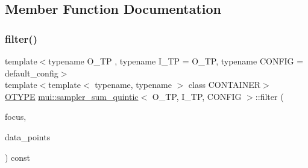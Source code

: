 \subsection{Member Function Documentation}
\mbox{\label{classmui_1_1sampler__sum__quintic_aadcd797ddd143dd5eacf60f9cfad5852}} 
\subsubsection{\texorpdfstring{filter()}{filter()}}
{\footnotesize\ttfamily template$<$typename O\+\_\+\+TP , typename I\+\_\+\+TP  = O\+\_\+\+TP, typename C\+O\+N\+F\+IG  = default\+\_\+config$>$ \\
template$<$template$<$ typename, typename $>$ class C\+O\+N\+T\+A\+I\+N\+ER$>$ \\
\hyperlink{classmui_1_1sampler__sum__quintic_a524db204f563b4f3d1eedded2e39ba8b}{O\+T\+Y\+PE} \hyperlink{classmui_1_1sampler__sum__quintic}{mui\+::sampler\+\_\+sum\+\_\+quintic}$<$ O\+\_\+\+TP, I\+\_\+\+TP, C\+O\+N\+F\+IG $>$\+::filter (\begin{DoxyParamCaption}\item[{\hyperlink{classmui_1_1sampler__sum__quintic_a661c2038a21043ac8e41beeeb07978ad}{point\+\_\+type}}]{focus,  }\item[{const C\+O\+N\+T\+A\+I\+N\+ER$<$ \hyperlink{classmui_1_1sampler__sum__quintic_aefb0c5d19f1e834ee9d4c41efe31d222}{I\+T\+Y\+PE}, C\+O\+N\+F\+IG $>$ \&}]{data\+\_\+points }\end{DoxyParamCaption}) const\hspace{0.3cm}{\ttfamily [inline]}}

\mbox{\label{classmui_1_1sampler__sum__quintic_a5864c34fdc7016a2bf6750ecc3b93f67}} 
